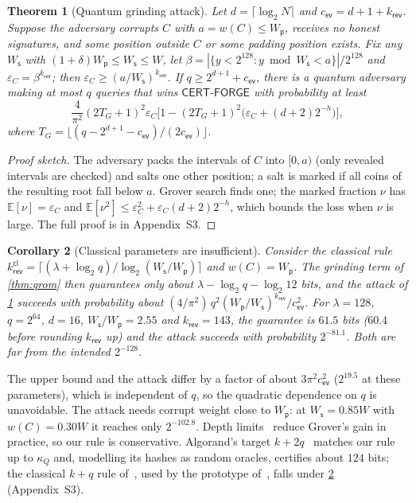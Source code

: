 \documentclass[10pt,journal,compsoc]{IEEEtran}
\theoremstyle{tplain}
\newtheorem{theorem}{Theorem}
\newtheorem{corollary}[theorem]{Corollary}
\theoremstyle{tdef}
\theoremstyle{remark}
\newcommand{\supp}[1]{Appendix~#1}
\newcommand{\Ws}{W_{\mathsf{s}}}
\newcommand{\Wp}{W_{\mathsf{p}}}
\newcommand{\kr}{k_{\mathsf{rev}}}
\begin{document}
\begin{theorem}[Quantum grinding attack]\label{thm:attack}
Let $d=\lceil\log_2 N\rceil$ and $c_{\mathsf{ev}}=d+1+\kr$. Suppose the adversary corrupts $C$ with $a=w(C)\le\Wp$, receives no honest signatures, and some position outside $C$ or some padding position exists. Fix any $\Ws$ with $(1+\delta)\Wp\le\Ws\le W$, let $\beta=|\{y<2^{128}: y\bmod\Ws<a\}|/2^{128}$ and $\varepsilon_C=\beta^{\kr}$; then $\varepsilon_C\ge(a/\Ws)^{\kr}$. If $q\ge 2^{d+1}+c_{\mathsf{ev}}$, there is a quantum adversary making at most $q$ queries that wins $\mathsf{CERT\text{-}FORGE}$ with probability at least
\[
\frac{4}{\pi^2}(2T_G+1)^2\varepsilon_C\Big[1-(2T_G+1)^2\big(\varepsilon_C+(d+2)2^{-h}\big)\Big],
\]
where $T_G=\lfloor(q-2^{d+1}-c_{\mathsf{ev}})/(2c_{\mathsf{ev}})\rfloor$.
\end{theorem}
\begin{proof}[Proof sketch]
The adversary packs the intervals of $C$ into $[0,a)$ (only revealed intervals are checked) and salts one other position; a salt is marked if all coins of the resulting root fall below $a$. Grover search finds one; the marked fraction $\nu$ has $\mathbb E[\nu]=\varepsilon_C$ and $\mathbb E[\nu^2]\le\varepsilon_C^2+\varepsilon_C(d+2)2^{-h}$, which bounds the loss when $\nu$ is large. The full proof is in \supp{S3}.
\end{proof}

\begin{corollary}[Classical parameters are insufficient]\label{cor:loss}
Consider the classical rule $\kr^{\mathsf{cl}}=\lceil(\lambda+\log_2 q)/\log_2(\Ws/\Wp)\rceil$ and $w(C)=\Wp$. The grinding term of \cref{thm:qrom} then guarantees only about $\lambda-\log_2 q-\log_2 12$ bits, and the attack of \cref{thm:attack} succeeds with probability about $(4/\pi^2)\,q^2(\Wp/\Ws)^{\kr}/c_{\mathsf{ev}}^2$. For $\lambda=128$, $q=2^{64}$, $d=16$, $\Ws/\Wp=2.55$ and $\kr=143$, the guarantee is $61.5$ bits ($60.4$ before rounding $\kr$ up) and the attack succeeds with probability $2^{-81.1}$. Both are far from the intended $2^{-128}$.
\end{corollary}

\noindent The upper bound and the attack differ by a factor of about $3\pi^2c_{\mathsf{ev}}^2$ ($2^{19.5}$ at these parameters), which is independent of $q$, so the quadratic dependence on $q$ is unavoidable. The attack needs corrupt weight close to $\Wp$: at $\Ws=0.85W$ with $w(C)=0.30W$ it reaches only $2^{-102.8}$. Depth limits~\cite{nistcfp2016} reduce Grover's gain in practice, so our rule is conservative. Algorand's target $k+2q$~\cite{algorand_stateproofs} matches our rule up to $\kappa_Q$ and, modelling its hashes as random oracles, certifies about $124$ bits; the classical $k+q$ rule of~\cite{micali2020compact}, used by the prototype of~\cite{NIROPoK2025}, falls under \cref{cor:loss} (\supp{S3}).
\end{document}
